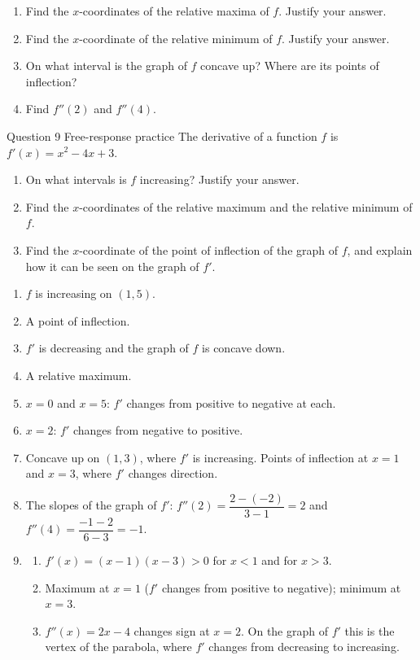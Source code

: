 \documentclass[11pt]{article}
\begin{document}
\begin{enumerate}[leftmargin=*,itemsep=2pt,start=5]
  \item Find the $x$-coordinates of the relative maxima of $f$. Justify your answer.\work{2.8cm}
  \item Find the $x$-coordinate of the relative minimum of $f$. Justify your answer.\work{2.8cm}
  \item On what interval is the graph of $f$ concave up? Where are its points of inflection?\work{2.8cm}
  \item Find $f''(2)$ and $f''(4)$.\work{2.8cm}
\end{enumerate}

\begin{frbox}{Question 9 \textperiodcentered{} Free-response practice}
The derivative of a function $f$ is $f'(x)=x^2-4x+3$.
\begin{enumerate}[label=(\alph*),leftmargin=*,itemsep=2pt]
  \item On what intervals is $f$ increasing? Justify your answer.\work{2.6cm}
  \item Find the $x$-coordinates of the relative maximum and the relative minimum of $f$.\work{2.6cm}
  \item Find the $x$-coordinate of the point of inflection of the graph of $f$, and explain how it can be seen on the graph of $f'$.\work{2.6cm}
\end{enumerate}
\end{frbox}

\newpage
\begin{solbox}
\begin{enumerate}[leftmargin=*,itemsep=4pt]
  \item $f$ is increasing on $(1,5)$.
  \item A point of inflection.
  \item $f'$ is decreasing and the graph of $f$ is concave down.
  \item A relative maximum.
  \item $x=0$ and $x=5$: $f'$ changes from positive to negative at each.
  \item $x=2$: $f'$ changes from negative to positive.
  \item Concave up on $(1,3)$, where $f'$ is increasing. Points of inflection at $x=1$ and $x=3$, where $f'$ changes direction.
  \item The slopes of the graph of $f'$: $f''(2)=\dfrac{2-(-2)}{3-1}=2$ and $f''(4)=\dfrac{-1-2}{6-3}=-1$.
  \item \begin{enumerate}[label=(\alph*),leftmargin=*,itemsep=3pt]
    \item $f'(x)=(x-1)(x-3)>0$ for $x<1$ and for $x>3$.
    \item Maximum at $x=1$ ($f'$ changes from positive to negative); minimum at $x=3$.
    \item $f''(x)=2x-4$ changes sign at $x=2$. On the graph of $f'$ this is the vertex of the parabola, where $f'$ changes from decreasing to increasing.
  \end{enumerate}
\end{enumerate}
\end{solbox}
\end{document}
